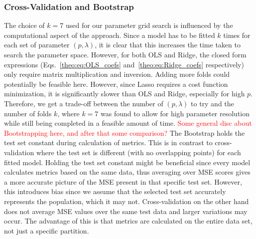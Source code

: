\documentclass[twocolumn,english,notitlepage]{article}
\newcommand{\comment}[1]{\textcolor{red}{#1}}
\begin{document}
        \subsubsection{Cross-Validation and Bootstrap} 
            The choice of $k=7$ used for our parameter grid search is influenced by the computational aspect of the approach. Since a model has to be fitted $k$ times for each set of parameter $(p,\lambda)$, it is clear that this increases the time taken to search the parameter space. However, for both OLS and Ridge, the closed form expressions (Eqs.~\eqref{theo:eq:OLS_coefs} and~\eqref{theo:eq:Ridge_coefs} respectively) only require matrix multiplication and inversion. Adding more folds could potentially be feasible here. However, since Lasso requires a cost function minimization, it is significantly slower than OLS and Ridge, especially for high $p$. Therefore, we get a trade-off between the number of $(p,\lambda)$ to try and the number of folds $k$, where $k=7$ was found to allow for high parameter resolution while still being completed in a feasible amount of time.
            \newline
            \comment{Some general disc about Bootstrapping here, and after that some comparison?}
            \newline
            The Bootstrap holds the test set constant during calculation of metrics. This is in contrast to cross-validation where the test set is different (with no overlapping points) for each fitted model. Holding the test set constant might be beneficial since every model calculates metrics based on the same data, thus averaging over MSE scores gives a more accurate picture of the MSE present in that specific test set. However, this introduces bias since we assume that the selected test set accurately represents the population, which it may not. Cross-validation on the other hand does not average MSE values over the same test data and larger variations may occur. The advantage of this is that metrics are calculated on the entire data set, not just a specific partition.          
\end{document}
